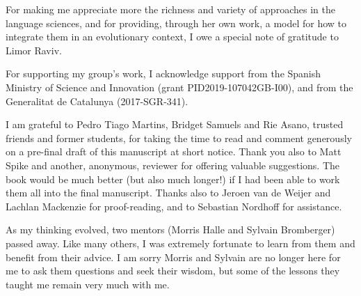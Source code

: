 For making me appreciate more the richness and variety of approaches in the language sciences, and for providing, through her own work, a model for how to integrate them in an evolutionary context, I owe a special note of gratitude to Limor Raviv.

For supporting my group's work, I acknowledge support from the Spanish Ministry of Science and Innovation (grant PID2019-107042GB-I00), and from the Generalitat de Catalunya (2017-SGR-341).

I am grateful to Pedro Tiago Martins, Bridget Samuels and Rie Asano, trusted friends and former students, for taking the time to read and comment generously on a pre-final draft of this manuscript at short notice. Thank you also to Matt Spike and another, anonymous, reviewer for offering valuable suggestions. The book would be much better (but also much longer!) if I had been able to work them all into the final manuscript. Thanks also to Jeroen van de Weijer and Lachlan Mackenzie for proof-reading, and to Sebastian Nordhoff for assistance.

As my thinking evolved, two mentors (Morris Halle and Sylvain Bromberger) passed away. Like many others, I was extremely fortunate to learn from them and benefit from their advice. I am sorry Morris and Sylvain are no longer here for me to ask them questions and seek their wisdom, but some of the lessons they taught me remain very much with me.

